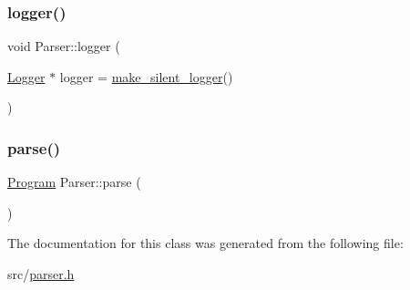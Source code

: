 \subsubsection{\texorpdfstring{logger()}{logger()}}
{\footnotesize\ttfamily void Parser\+::logger (\begin{DoxyParamCaption}\item[{\hyperlink{class_logger}{Logger} $\ast$}]{logger = {\ttfamily \hyperlink{logger_8h_a4a91393d9aac15039de84d6a92cadfd0}{make\+\_\+silent\+\_\+logger}()} }\end{DoxyParamCaption})\hspace{0.3cm}{\ttfamily [inline]}}

\mbox{\label{class_parser_a20466f8f29d69499dfa12092cd737211}} 
\subsubsection{\texorpdfstring{parse()}{parse()}}
{\footnotesize\ttfamily \hyperlink{struct_program}{Program} Parser\+::parse (\begin{DoxyParamCaption}{ }\end{DoxyParamCaption})\hspace{0.3cm}{\ttfamily [inline]}}



The documentation for this class was generated from the following file\+:\begin{DoxyCompactItemize}
\item 
src/\hyperlink{parser_8h}{parser.\+h}\end{DoxyCompactItemize}
